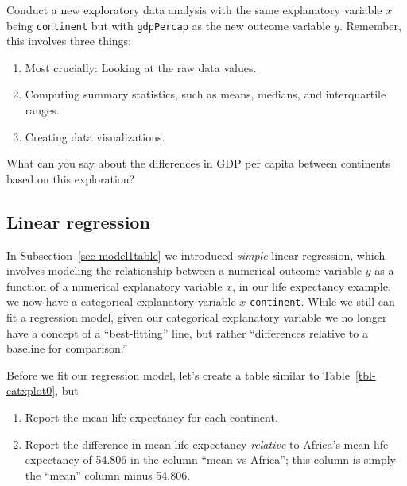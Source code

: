 \documentclass[
  letterpaper,
  DIV=11,
  numbers=noendperiod]{scrreprt}
\providecommand{\tightlist}{%
  \setlength{\itemsep}{0pt}\setlength{\parskip}{0pt}}\usepackage{longtable,booktabs,array}
\theoremstyle{definition}
\theoremstyle{remark}
\begin{document}
\begin{tcolorbox}[enhanced jigsaw, colback=white, toprule=.15mm, bottomrule=.15mm, titlerule=0mm, title={{🎯} Learning Check 5.3}, leftrule=.75mm, arc=.35mm, left=2mm, colframe=quarto-callout-tip-color-frame, coltitle=black, opacitybacktitle=0.6, bottomtitle=1mm, colbacktitle=quarto-callout-tip-color!10!white, opacityback=0, toptitle=1mm, rightrule=.15mm, breakable]

Conduct a new exploratory data analysis with the same explanatory
variable \(x\) being \texttt{continent} but with \texttt{gdpPercap} as
the new outcome variable \(y\). Remember, this involves three things:

\begin{enumerate}
\def\labelenumi{\arabic{enumi}.}
\tightlist
\item
  Most crucially: Looking at the raw data values.
\item
  Computing summary statistics, such as means, medians, and
  interquartile ranges.
\item
  Creating data visualizations.
\end{enumerate}

What can you say about the differences in GDP per capita between
continents based on this exploration?

\end{tcolorbox}

\hypertarget{sec-model2table}{%
\subsection{Linear regression}\label{sec-model2table}}

In Subsection~\ref{sec-model1table} we introduced \emph{simple} linear
regression, which involves modeling the relationship between a numerical
outcome variable \(y\) as a function of a numerical explanatory variable
\(x\), in our life expectancy example, we now have a categorical
explanatory variable \(x\) \texttt{continent}. While we still can fit a
regression model, given our categorical explanatory variable we no
longer have a concept of a ``best-fitting'' line, but rather
``differences relative to a baseline for comparison.''

Before we fit our regression model, let's create a table similar to
Table~\ref{tbl-catxplot0}, but

\begin{enumerate}
\def\labelenumi{\arabic{enumi}.}
\item
  Report the mean life expectancy for each continent.
\item
  Report the difference in mean life expectancy \emph{relative} to
  Africa's mean life expectancy of 54.806 in the column ``mean vs
  Africa''; this column is simply the ``mean'' column minus 54.806.
\end{enumerate}
\end{document}
